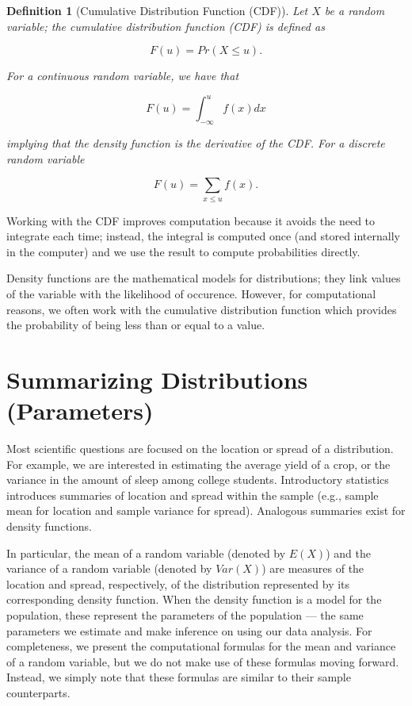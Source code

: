\documentclass[
]{book}
\theoremstyle{plain}
\theoremstyle{mydefn}
\newtheorem{definition}{Definition}[chapter]
\theoremstyle{myexmpl}
\theoremstyle{remark}
\begin{document}
\begin{definition}[Cumulative Distribution Function (CDF)]
Let \(X\) be a random variable; the cumulative distribution function (CDF) is defined as

\[F(u) = Pr(X \leq u).\]

For a continuous random variable, we have that

\[F(u) = \int_{-\infty}^{u} f(x) dx\]

implying that the density function is the derivative of the CDF. For a discrete random variable

\[F(u) = \sum_{x \leq u} f(x).\]
\end{definition}

Working with the CDF improves computation because it avoids the need to integrate each time; instead, the integral is computed once (and stored internally in the computer) and we use the result to compute probabilities directly.

\begin{rmdkeyidea}
Density functions are the mathematical models for distributions; they link values of the variable with the likelihood of occurence. However, for computational reasons, we often work with the cumulative distribution function which provides the probability of being less than or equal to a value.
\end{rmdkeyidea}

\hypertarget{summarizing-distributions-parameters}{%
\section{Summarizing Distributions (Parameters)}\label{summarizing-distributions-parameters}}

Most scientific questions are focused on the location or spread of a distribution. For example, we are interested in estimating the average yield of a crop, or the variance in the amount of sleep among college students. Introductory statistics introduces summaries of location and spread within the sample (e.g., sample mean for location and sample variance for spread). Analogous summaries exist for density functions.

In particular, the mean of a random variable (denoted by \(E(X)\)) and the variance of a random variable (denoted by \(Var(X)\)) are measures of the location and spread, respectively, of the distribution represented by its corresponding density function. When the density function is a model for the population, these represent the parameters of the population --- the same parameters we estimate and make inference on using our data analysis. For completeness, we present the computational formulas for the mean and variance of a random variable, but we do not make use of these formulas moving forward. Instead, we simply note that these formulas are similar to their sample counterparts.
\end{document}
